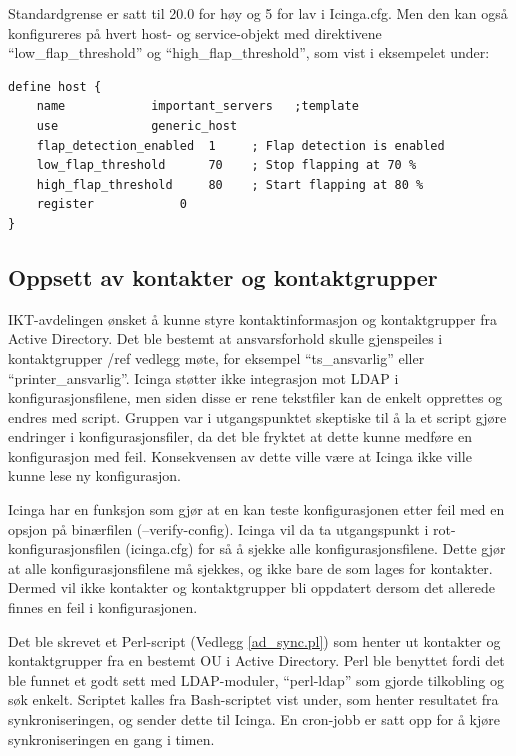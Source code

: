 Standardgrense er satt til 20.0 for høy og 5 for lav i Icinga.cfg. Men den kan også konfigureres på hvert host- og service-objekt med direktivene ``low\_flap\_threshold'' og ``high\_flap\_threshold'', som vist i eksempelet under:
\begin{lstlisting}[style=example]
define host {
    name 			important_servers  	;template
    use				generic_host
    flap_detection_enabled	1     ; Flap detection is enabled
    low_flap_threshold		70    ; Stop flapping at 70 %
    high_flap_threshold		80    ; Start flapping at 80 %
    register			0
}
\end{lstlisting}

\subsection{Oppsett av kontakter og kontaktgrupper}\label{sec:sync}
IKT-avdelingen ønsket å kunne styre kontaktinformasjon og kontaktgrupper fra Active Directory. Det ble bestemt at ansvarsforhold skulle gjenspeiles i kontaktgrupper /ref vedlegg møte, for eksempel ``ts\_ansvarlig'' eller ``printer\_ansvarlig''. Icinga støtter ikke integrasjon mot LDAP i konfigurasjonsfilene, men siden disse er rene tekstfiler kan de enkelt opprettes og endres med script. Gruppen var i utgangspunktet skeptiske til å la et script gjøre endringer i konfigurasjonsfiler, da det ble fryktet at dette kunne medføre en konfigurasjon med feil. Konsekvensen av dette ville være at Icinga ikke ville kunne lese ny konfigurasjon.

Icinga har en funksjon som gjør at en kan teste konfigurasjonen etter feil med en opsjon på binærfilen (--verify-config). Icinga vil da ta utgangspunkt i rot-konfigurasjonsfilen (icinga.cfg) for så å sjekke alle konfigurasjonsfilene. Dette gjør at alle konfigurasjonsfilene må sjekkes, og ikke bare de som lages for kontakter. Dermed vil ikke kontakter og kontaktgrupper bli oppdatert dersom det allerede finnes en feil i konfigurasjonen. 

Det ble skrevet et Perl-script (Vedlegg \ref{ad_sync.pl}) som henter ut kontakter og kontaktgrupper fra en bestemt OU i Active Directory. Perl ble benyttet fordi det ble funnet et godt sett med LDAP-moduler, ``perl-ldap''\cite{perlldap} som gjorde tilkobling og søk enkelt. Scriptet kalles fra Bash-scriptet vist under, som henter resultatet fra synkroniseringen, og sender dette til Icinga. En cron-jobb er satt opp for å kjøre synkroniseringen en gang i timen.

